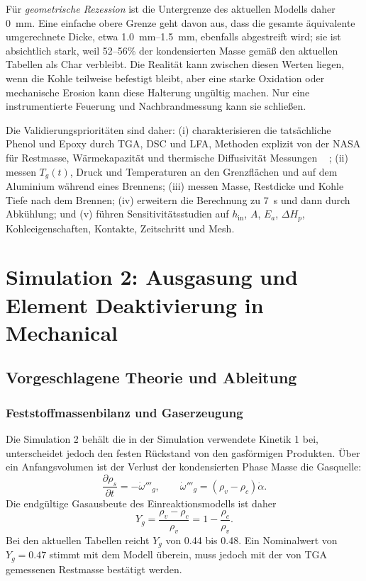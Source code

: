 \documentclass[oneside,openany]{amsdtx}
\newcommand{\pd}{\partial}
\begin{document}
Für \emph{geometrische Rezession} ist die Untergrenze des aktuellen Modells daher \SI{0}{mm}. Eine einfache obere Grenze geht davon aus, dass die gesamte äquivalente umgerechnete Dicke, etwa \SIrange{1.0}{1.5}{mm}, ebenfalls abgestreift wird; sie ist absichtlich stark, weil 52--56\% der kondensierten Masse gemäß den aktuellen Tabellen als Char verbleibt. Die Realität kann zwischen diesen Werten liegen, wenn die Kohle teilweise befestigt bleibt, aber eine starke Oxidation oder mechanische Erosion kann diese Halterung ungültig machen. Nur eine instrumentierte Feuerung und Nachbrandmessung kann sie schließen.

Die Validierungsprioritäten sind daher: (i) charakterisieren die tatsächliche Phenol und Epoxy durch TGA, DSC und LFA, Methoden explizit von der NASA für Restmasse, Wärmekapazität und thermische Diffusivität Messungen ~ \cite{nasa-testing}; (ii) messen \(T_g(t)\), Druck und Temperaturen an den Grenzflächen und auf dem Aluminium während eines Brennens; (iii) messen Masse, Restdicke und Kohle Tiefe nach dem Brennen; (iv) erweitern die Berechnung zu \SI{7}{s} und dann durch Abkühlung; und (v) führen Sensitivitätsstudien auf \(h_\mathrm{in}\), \(A\), \(E_a\), \(\Delta H_p\), Kohleeigenschaften, Kontakte, Zeitschritt und Mesh.

\clearpage
\section{Simulation 2: Ausgasung und Element Deaktivierung in Mechanical}

\subsection{Vorgeschlagene Theorie und Ableitung}

\subsubsection{Feststoffmassenbilanz und Gaserzeugung}

Die Simulation 2 behält die in der Simulation verwendete Kinetik 1 bei, unterscheidet jedoch den festen Rückstand von den gasförmigen Produkten. Über ein Anfangsvolumen ist der Verlust der kondensierten Phase Masse die Gasquelle:
\begin{equation}
  \frac{\pd\rho_s}{\pd t}=-\dot\omega'''_g,
  \qquad
  \dot\omega'''_g=(\rho_v-\rho_c)\dot\alpha.
  \label{eq:solid-mass-sim2}
\end{equation}
Die endgültige Gasausbeute des Einreaktionsmodells ist daher
\begin{equation}
  Y_g=\frac{\rho_v-\rho_c}{\rho_v}=1-\frac{\rho_c}{\rho_v}.
  \label{eq:gas-yield}
\end{equation}
Bei den aktuellen Tabellen reicht \(Y_g\) von 0.44 bis 0.48. Ein Nominalwert von \(Y_g=0.47\) stimmt mit dem Modell überein, muss jedoch mit der von TGA gemessenen Restmasse bestätigt werden.
\end{document}
